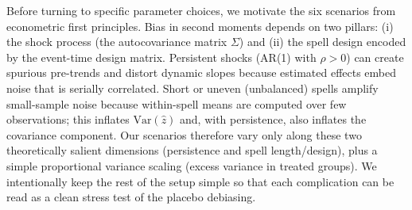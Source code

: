 \documentclass[11pt,a4paper]{article}
\newcommand{\Var}{\text{Var}}
\begin{document}
Before turning to specific parameter choices, we motivate the six scenarios from econometric first principles. Bias in second moments depends on two pillars: (i) the shock process (the autocovariance matrix \(\Sigma\)) and (ii) the spell design encoded by the event-time design matrix. Persistent shocks (AR(1) with \(\rho>0\)) can create spurious pre-trends and distort dynamic slopes because estimated effects embed noise that is serially correlated. Short or uneven (unbalanced) spells amplify small-sample noise because within-spell means are computed over few observations; this inflates \(\Var(\hat z)\) and, with persistence, also inflates the covariance component. Our scenarios therefore vary only along these two theoretically salient dimensions (persistence and spell length/design), plus a simple proportional variance scaling (excess variance in treated groups). We intentionally keep the rest of the setup simple so that each complication can be read as a clean stress test of the placebo debiasing.
\end{document}
